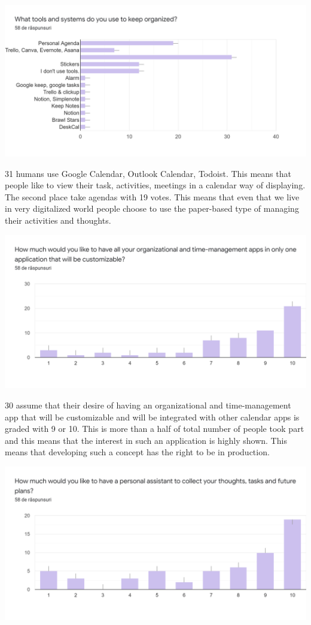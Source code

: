 \par
\includegraphics[width=\textwidth]{CustomerValidation3}
\par 31 humans use Google Calendar, Outlook Calendar, Todoist. This means that people like to view their task, activities, meetings in a calendar way of displaying. The second place take agendas with 19 votes. This means that even that we live in very digitalized world people choose to use the paper-based type of managing their activities and thoughts.
\par
\includegraphics[width=\textwidth]{CustomerValidation4}
\par 30 assume that their desire of having an organizational and time-management app that will be customizable and will be integrated with other calendar apps is graded with 9 or 10. This is more than a half of total number of people took part and this means that the interest in such an application is highly shown. This means that developing such a concept has the right to be in production.
\par
\includegraphics[width=\textwidth]{CustomerValidation5}
